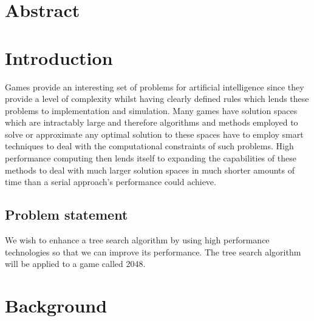 \documentclass[a4paper]{article}
\begin{document}
\begin{titlepage}

 

\vfill %

\end{titlepage}

\clearpage
\setcounter{page}{1}

\section*{Abstract}

\section{Introduction}
Games provide an interesting set of problems for artificial intelligence since they provide a level of complexity whilst having clearly defined rules which lends these problems to implementation and simulation. Many games have solution spaces which are intractably large and therefore algorithms and methods employed to solve or approximate any optimal solution to these spaces have to employ smart techniques to deal with the computational constraints of such problems. High performance computing then lends itself to expanding the capabilities of these methods to deal with much larger solution spaces in much shorter amounts of time than a serial approach’s performance could achieve. \cite{AIModern}

\subsection{Problem statement}
We wish to enhance a tree search algorithm by using high performance technologies so that we can improve its performance. The tree search algorithm will be applied to a game called 2048.

\section{Background}
\end{document}
